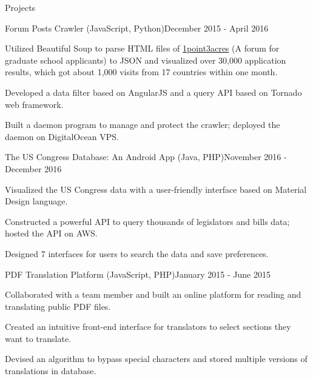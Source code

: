 \documentclass{resume} %
\begin{document}

\begin{rSection}{Projects}

\begin{rSubsection}{Forum Posts Crawler (JavaScript, Python)}{December 2015 - April 2016}{}{}
\item Utilized Beautiful Soup to parse HTML files of \href{http://1point3acres.com/bbs/forum.php}{1point3acres} (A forum for graduate school applicants) to JSON and visualized over 30,000 application results, which got about 1,000 visits from 17 countries within one month.
\item Developed a data filter based on AngularJS and a query API based on Tornado web framework.
\item Built a daemon program to manage and protect the crawler; deployed the daemon on DigitalOcean VPS.
\end{rSubsection}

\begin{rSubsection}{The US Congress Database: An Android App (Java, PHP)}{November 2016 - December 2016}{}{}
\item Visualized the US Congress data with a user-friendly interface based on Material Design language.
\item Constructed a powerful API to query thousands of legislators and bills data; hosted the API on AWS.
\item Designed 7 interfaces for users to search the data and save preferences.
\end{rSubsection}

%
\begin{rSubsection}{PDF Translation Platform (JavaScript, PHP)}{January 2015 - June 2015}{}{}
\item Collaborated with a team member and built an online platform for reading and translating public PDF files.
\item Created an intuitive front-end interface for translators to select sections they want to translate.
\item Devised an algorithm to bypass special characters and stored multiple versions of translations in database.
\end{rSubsection}


\end{rSection}
\end{document}
